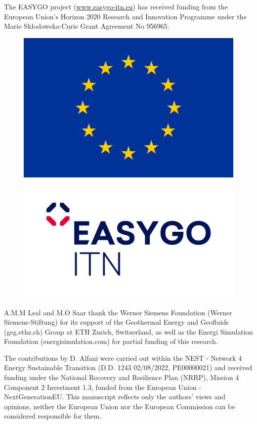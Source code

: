 The EASYGO project (\url{www.easygo-itn.eu}) has received funding from the European Union’s Horizon 2020 Research and Innovation Programme under the Marie Skłodowska-Curie Grant Agreement No 956965.

\begin{figure}
    \centering
    \includegraphics[width=0.25\linewidth]{Images/eu_logo.png}
    \includegraphics[width=0.25\linewidth]{Images/Logo-EasyGo-Color.png}
\end{figure}

A.M.M Leal and M.O Saar thank the Werner Siemens Foundation (Werner Siemens-Stiftung) for its support of the Geothermal Energy and Geofluids (geg.ethz.ch) Group at ETH Zurich, Switzerland, as well as the Energi Simulation Foundation (energisimulation.com) for partial funding of this research.

The contributions by D. Alfani were carried out within the NEST - Network 4 Energy Sustainable Transition (D.D. 1243 02/08/2022, PE00000021) and received funding under the National Recovery and Resilience Plan (NRRP), Mission 4 Component 2 Investment 1.3, funded from the European Union - NextGenerationEU. This manuscript reflects only the authors’ views and opinions, neither the European Union nor the European Commission can be considered responsible for them.
